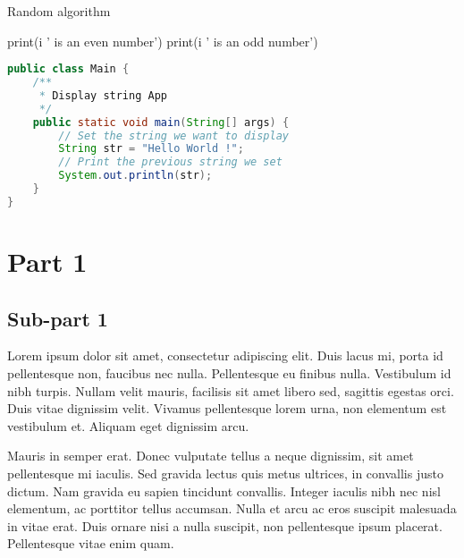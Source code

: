 \documentclass[a4paper,15pt]{article}
\begin{document}
\begin{algorithm}
    \caption{Random algorithm}
    \begin{algorithmic}
    \ENSURE
            \STATE print(i ' is an even number')
        \ENDIF
    \ENDFOR
            \STATE print(i ' is an odd number')
        \ENDIF
    \ENDWHILE
    \ELSE
    \ENDIF
    \end{algorithmic}
\end{algorithm}

\begin{lstlisting}[language=Java, style=javaStyle]
public class Main {
    /**
     * Display string App
     */
    public static void main(String[] args) {
        // Set the string we want to display
        String str = "Hello World !";
        // Print the previous string we set
        System.out.println(str);
    }
}
\end{lstlisting}

\newpage

\section{Part 1}

\subsection{Sub-part 1}

Lorem ipsum dolor sit amet, consectetur adipiscing elit. Duis lacus mi, porta id pellentesque non, faucibus nec nulla. Pellentesque eu finibus nulla. Vestibulum id nibh turpis. Nullam velit mauris, facilisis sit amet libero sed, sagittis egestas orci. Duis vitae dignissim velit. Vivamus pellentesque lorem urna, non elementum est vestibulum et. Aliquam eget dignissim arcu.

Mauris in semper erat. Donec vulputate tellus a neque dignissim, sit amet pellentesque mi iaculis. Sed gravida lectus quis metus ultrices, in convallis justo dictum. Nam gravida eu sapien tincidunt convallis. Integer iaculis nibh nec nisl elementum, ac porttitor tellus accumsan. Nulla et arcu ac eros suscipit malesuada in vitae erat. Duis ornare nisi a nulla suscipit, non pellentesque ipsum placerat. Pellentesque vitae enim quam.
\end{document}
